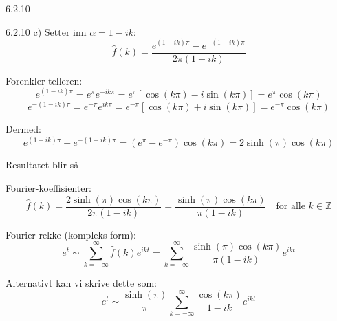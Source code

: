 \documentclass[a4paper,norsk]{article}
\begin{document}
\begin{oppgavebox}{6.2.10}{}
\begin{proofbox}{6.2.10 c)}{}
Setter inn $\alpha = 1 - ik$:
\[
\hat{f}(k) = \frac{e^{(1 - ik)\pi} - e^{-(1 - ik)\pi}}{2\pi (1 - ik)}
\]

Forenkler telleren:
\[
e^{(1 - ik)\pi} = e^{\pi} e^{-ik\pi} = e^{\pi} [\cos(k\pi) - i\sin(k\pi)] = e^{\pi} \cos(k\pi)
\]
\[
e^{-(1 - ik)\pi} = e^{-\pi} e^{ik\pi} = e^{-\pi} [\cos(k\pi) + i\sin(k\pi)] = e^{-\pi} \cos(k\pi)
\]

Dermed:
\[
e^{(1 - ik)\pi} - e^{-(1 - ik)\pi} = (e^{\pi} - e^{-\pi}) \cos(k\pi) = 2\sinh(\pi) \cos(k\pi)
\]

Resultatet blir så

Fourier-koeffisienter:
\[
\hat{f}(k) = \frac{2\sinh(\pi) \cos(k\pi)}{2\pi (1 - ik)}
= \frac{\sinh(\pi) \cos(k\pi)}{\pi (1 - ik)}
\quad \text{for alle } k \in \mathbb{Z}
\]

Fourier-rekke (kompleks form):
\[
e^t \sim \sum_{k=-\infty}^{\infty} \hat{f}(k)e^{ikt} 
= \sum_{k=-\infty}^{\infty} \frac{\sinh(\pi) \cos(k\pi)}{\pi (1 - ik)} e^{ikt}
\]

Alternativt kan vi skrive dette som:
\[
e^t \sim \frac{\sinh(\pi)}{\pi} \sum_{k=-\infty}^{\infty} \frac{\cos(k\pi)}{1 - ik} e^{ikt}
\]


\end{proofbox}
\end{oppgavebox}
\end{document}
